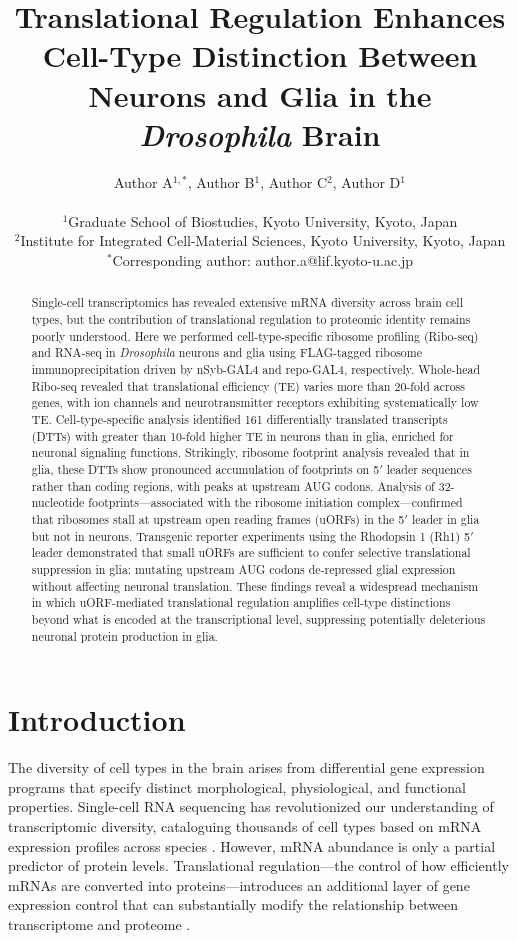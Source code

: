 \documentclass[12pt]{article}
\title{Translational Regulation Enhances Cell-Type Distinction Between Neurons and Glia in the \textit{Drosophila} Brain}
\author{Author A$^{1,*}$, Author B$^{1}$, Author C$^{2}$, Author D$^{1}$ \\
\\
\small $^{1}$Graduate School of Biostudies, Kyoto University, Kyoto, Japan \\
\small $^{2}$Institute for Integrated Cell-Material Sciences, Kyoto University, Kyoto, Japan \\
\small $^{*}$Corresponding author: author.a@lif.kyoto-u.ac.jp}
\date{}
\begin{document}
\maketitle

\begin{abstract}
Single-cell transcriptomics has revealed extensive mRNA diversity across brain cell types, but the contribution of translational regulation to proteomic identity remains poorly understood. Here we performed cell-type-specific ribosome profiling (Ribo-seq) and RNA-seq in \textit{Drosophila} neurons and glia using FLAG-tagged ribosome immunoprecipitation driven by nSyb-GAL4 and repo-GAL4, respectively. Whole-head Ribo-seq revealed that translational efficiency (TE) varies more than 20-fold across genes, with ion channels and neurotransmitter receptors exhibiting systematically low TE. Cell-type-specific analysis identified 161 differentially translated transcripts (DTTs) with greater than 10-fold higher TE in neurons than in glia, enriched for neuronal signaling functions. Strikingly, ribosome footprint analysis revealed that in glia, these DTTs show pronounced accumulation of footprints on 5$'$ leader sequences rather than coding regions, with peaks at upstream AUG codons. Analysis of 32-nucleotide footprints---associated with the ribosome initiation complex---confirmed that ribosomes stall at upstream open reading frames (uORFs) in the 5$'$ leader in glia but not in neurons. Transgenic reporter experiments using the Rhodopsin 1 (Rh1) 5$'$ leader demonstrated that small uORFs are sufficient to confer selective translational suppression in glia: mutating upstream AUG codons de-repressed glial expression without affecting neuronal translation. These findings reveal a widespread mechanism in which uORF-mediated translational regulation amplifies cell-type distinctions beyond what is encoded at the transcriptional level, suppressing potentially deleterious neuronal protein production in glia.
\end{abstract}

\section{Introduction}

The diversity of cell types in the brain arises from differential gene expression programs that specify distinct morphological, physiological, and functional properties. Single-cell RNA sequencing has revolutionized our understanding of transcriptomic diversity, cataloguing thousands of cell types based on mRNA expression profiles across species \citep{zeisel2015cell, davie2018single, li2022atlas}. However, mRNA abundance is only a partial predictor of protein levels. Translational regulation---the control of how efficiently mRNAs are converted into proteins---introduces an additional layer of gene expression control that can substantially modify the relationship between transcriptome and proteome \citep{schwanhausser2011global, ingolia2019ribosome}.
\end{document}
